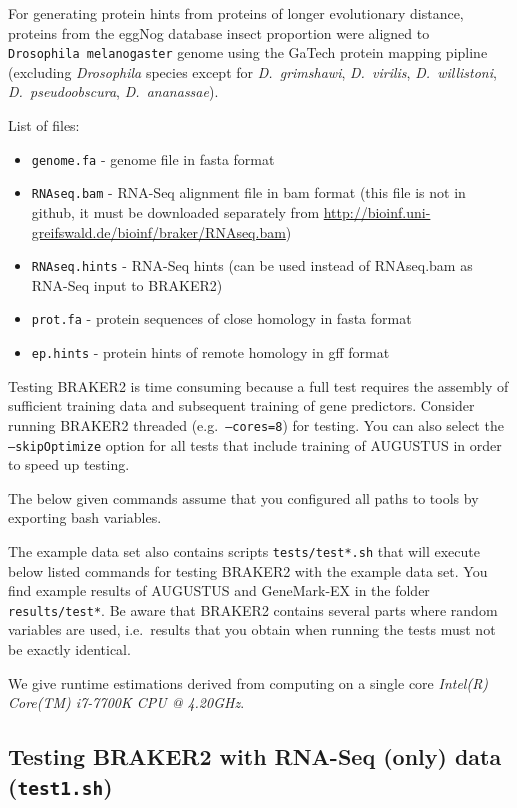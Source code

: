 \documentclass[]{article}
\begin{document}
For generating protein hints from proteins of longer evolutionary
distance, proteins from the eggNog database insect proportion were
aligned to \texttt{Drosophila\ melanogaster} genome using the GaTech
protein mapping pipline (excluding \emph{Drosophila} species except for
\emph{D.~grimshawi}, \emph{D.~virilis}, \emph{D.~willistoni},
\emph{D.~pseudoobscura}, \emph{D.~ananassae}).

List of files:

\begin{itemize}
\item
  \texttt{genome.fa} - genome file in fasta format
\item
  \texttt{RNAseq.bam} - RNA-Seq alignment file in bam format (this file
  is not in github, it must be downloaded separately from
  \url{http://bioinf.uni-greifswald.de/bioinf/braker/RNAseq.bam})
\item
  \texttt{RNAseq.hints} - RNA-Seq hints (can be used instead of
  RNAseq.bam as RNA-Seq input to BRAKER2)
\item
  \texttt{prot.fa} - protein sequences of close homology in fasta format
\item
  \texttt{ep.hints} - protein hints of remote homology in gff format
\end{itemize}

Testing BRAKER2 is time consuming because a full test requires the
assembly of sufficient training data and subsequent training of gene
predictors. Consider running BRAKER2 threaded (e.g.~\texttt{–cores=8})
for testing. You can also select the \texttt{–skipOptimize} option for
all tests that include training of AUGUSTUS in order to speed up
testing.

The below given commands assume that you configured all paths to tools
by exporting bash variables.

The example data set also contains scripts \texttt{tests/test*.sh} that
will execute below listed commands for testing BRAKER2 with the example
data set. You find example results of AUGUSTUS and GeneMark-EX in the
folder \texttt{results/test*}. Be aware that BRAKER2 contains several
parts where random variables are used, i.e.~results that you obtain when
running the tests must not be exactly identical.

We give runtime estimations derived from computing on a single core
\emph{Intel(R) Core(TM) i7-7700K CPU @ 4.20GHz}.

\subsection{Testing BRAKER2 with RNA-Seq (only) data (\texttt{test1.sh})}\label{testing-braker2-with-rna-seq-only-data-test1.sh}
\end{document}
